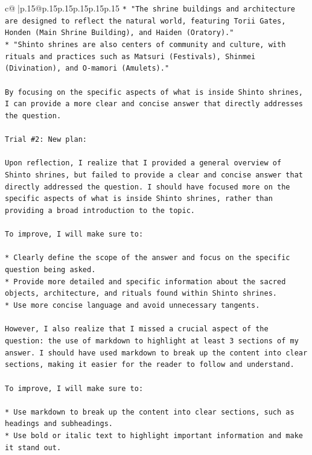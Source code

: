\documentclass{article}
\begin{document}
{\begin{supertabular}{c@{$\;$}|p{.15\linewidth}@{}p{.15\linewidth}p{.15\linewidth}p{.15\linewidth}p{.15\linewidth}p{.15\linewidth}}
{{{\texttt{* "The shrine buildings and architecture are designed to reflect the natural world, featuring Torii Gates, Honden (Main Shrine Building), and Haiden (Oratory)."} \\
\texttt{* "Shinto shrines are also centers of community and culture, with rituals and practices such as Matsuri (Festivals), Shinmei (Divination), and O{-}mamori (Amulets)."} \\
\\ 
\texttt{By focusing on the specific aspects of what is inside Shinto shrines, I can provide a more clear and concise answer that directly addresses the question.} \\
\\ 
\texttt{Trial \#2: New plan: } \\
\\ 
\texttt{Upon reflection, I realize that I provided a general overview of Shinto shrines, but failed to provide a clear and concise answer that directly addressed the question. I should have focused more on the specific aspects of what is inside Shinto shrines, rather than providing a broad introduction to the topic.} \\
\\ 
\texttt{To improve, I will make sure to:} \\
\\ 
\texttt{* Clearly define the scope of the answer and focus on the specific question being asked.} \\
\texttt{* Provide more detailed and specific information about the sacred objects, architecture, and rituals found within Shinto shrines.} \\
\texttt{* Use more concise language and avoid unnecessary tangents.} \\
\\ 
\texttt{However, I also realize that I missed a crucial aspect of the question: the use of markdown to highlight at least 3 sections of my answer. I should have used markdown to break up the content into clear sections, making it easier for the reader to follow and understand.} \\
\\ 
\texttt{To improve, I will make sure to:} \\
\\ 
\texttt{* Use markdown to break up the content into clear sections, such as headings and subheadings.} \\
\texttt{* Use bold or italic text to highlight important information and make it stand out.} \\
}}}
\end{supertabular}}
\end{document}
